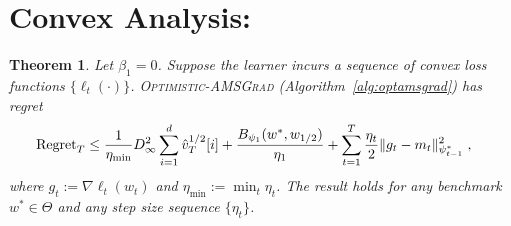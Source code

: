 \documentclass[11pt]{article}
\newtheorem{Theorem}{Theorem}
\theoremstyle{k}
\begin{document}
\clearpage

\section{Convex Analysis:}

\begin{Theorem} \label{thm:convexmain}
Let $\beta_{1}=0$. Suppose the learner incurs a sequence of convex loss functions $\{ \ell_{t}(\cdot) \}$.
\textsc{Optimistic-AMSGrad} (Algorithm~\ref{alg:optamsgrad}) 
has regret 
\begin{equation} \label{bound:optada}
\begin{aligned}
\textstyle
 \text{Regret}_T &  \leq  \frac{1}{\eta_{\min}} D_{\infty}^2 \sum_{i=1}^d \hat{v}_{T}^{1/2}[i] + \frac{ B_{\psi_1}(w^*, w_{1/2})}{\eta_1} + \sum_{t=1}^T\frac{\eta_t}{2} \| g_t - m_t  \|_{\psi_{t-1}^*}^2 \;,
\end{aligned}
\end{equation}
where $g_{t}:= \nabla \ell_{t}(w_t)$ and $\eta_{{\min}} := \min_{{t}} \eta_{t}$.
The result holds for any benchmark $w^{*} \in \Theta$ and any step size sequence $\{ \eta_t \}$.
\end{Theorem}
\end{document}
